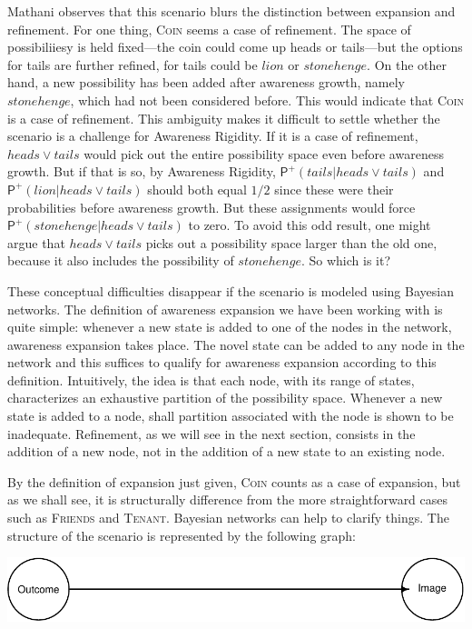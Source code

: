 \documentclass[
  11pt,
  dvipsnames,enabledeprecatedfontcommands]{scrartcl}
\newcommand{\ppr}[2]{\ensuremath{\mathsf{P}^{#1}(#2)}}
\begin{document}
Mathani observes that this scenario blurs the distinction between
expansion and refinement. For one thing, \textsc{Coin} seems a case of
refinement. The space of possibiliiesy is held fixed---the coin could
come up heads or tails---but the options for tails are further refined,
for tails could be \(lion\) or \(stonehenge\). On the other hand, a new
possibility has been added after awareness growth, namely
\(stonehenge\), which had not been considered before. This would
indicate that \textsc{Coin} is a case of refinement. This ambiguity
makes it difficult to settle whether the scenario is a challenge for
Awareness Rigidity. If it is a case of refinement, \(heads \vee tails\)
would pick out the entire possibility space even before awareness
growth. But if that is so, by Awareness Rigidity,
\(\ppr{+}{tails \vert heads \vee tails}\) and
\(\ppr{+}{lion \vert heads \vee tails}\) should both equal \(1/2\) since
these were their probabilities before awareness growth. But these
assignments would force \(\ppr{+}{stonehenge \vert heads \vee tails}\)
to zero. To avoid this odd result, one might argue that
\(heads \vee tails\) picks out a possibility space larger than the old
one, because it also includes the possibility of \(stonehenge\). So
which is it?

These conceptual difficulties disappear if the scenario is modeled using
Bayesian networks. The definition of awareness expansion we have been
working with is quite simple: whenever a new state is added to one of
the nodes in the network, awareness expansion takes place. The novel
state can be added to any node in the network and this suffices to
qualify for awareness expansion according to this definition.
Intuitively, the idea is that each node, with its range of states,
characterizes an exhaustive partition of the possibility space. Whenever
a new state is added to a node, shall partition associated with the node
is shown to be inadequate. Refinement, as we will see in the next
section, consists in the addition of a new node, not in the addition of
a new state to an existing node.

By the definition of expansion just given, \textsc{Coin} counts as a
case of expansion, but as we shall see, it is structurally difference
from the more straightforward cases such as \textsc{Friends} and
\textsc{Tenant}. Bayesian networks can help to clarify things. The
structure of the scenario is represented by the following graph:

\begin{center}\includegraphics[width=0.5\linewidth,height=0.3\textheight]{ReplyToSteeleStefansson5_files/figure-latex/tailsDAG-1} \end{center}
\end{document}
